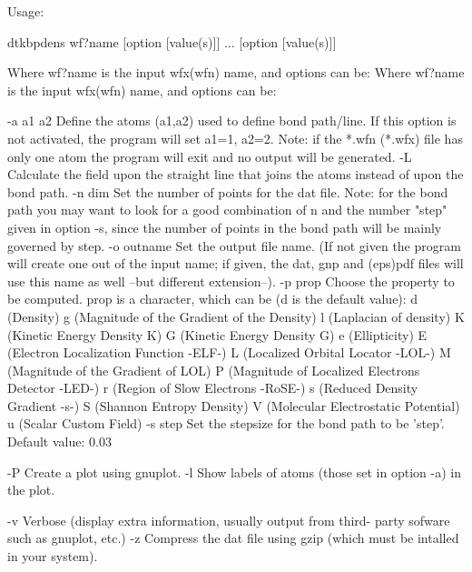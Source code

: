 

Usage:

	dtkbpdens wf?name [option [value(s)]] ... [option [value(s)]]

Where wf?name is the input wfx(wfn) name, and options can be:
Where wf?name is the input wfx(wfn) name, and options can be:

  -a a1 a2  	Define the atoms  (a1,a2) used to define bond path/line.
            	  If this option is not activated, the program will 
            	  set a1=1, a2=2.
            	  Note: if the *.wfn (*.wfx) file has only one atom
            	  the program will exit and no output will be generated.
  -L        	Calculate the field upon the straight line that joins the atoms
            	  instead of upon the bond path.
  -n  dim   	Set the number of points for the dat file.
            	  Note: for the bond path you may want to look for a good 
            	  combination of n and the number "step" given in option -s,
            	  since the number of points in the bond path will be mainly 
            	  governed by step.
  -o outname	Set the output file name.
            	  (If not given the program will create one out of
            	  the input name; if given, the dat, gnp and (eps)pdf files will
            	  use this name as well --but different extension--).
  -p prop   	Choose the property to be computed. prop is a character,
            	  which can be (d is the default value): 
            		d (Density)
            		g (Magnitude of the Gradient of the Density)
            		l (Laplacian of density)
            		K (Kinetic Energy Density K)
            		G (Kinetic Energy Density G)
            		e (Ellipticity)
            		E (Electron Localization Function -ELF-)
            		L (Localized Orbital Locator -LOL-)
            		M (Magnitude of the Gradient of LOL)
            		P (Magnitude of Localized Electrons Detector -LED-)
            		r (Region of Slow Electrons -RoSE-)
            		s (Reduced Density Gradient -s-)
            		S (Shannon Entropy Density)
            		V (Molecular Electrostatic Potential)
            		u (Scalar Custom Field)
  -s step   	Set the stepsize for the bond path to be 'step'.
            	  Default value: 0.03

  -P     	Create a plot using gnuplot.
  -l     	Show labels of atoms (those set in option -a) in the plot.

  -v     	Verbose (display extra information, usually output from third-
         	  party sofware such as gnuplot, etc.)
  -z     	Compress the dat file using gzip (which must be intalled
         	   in your system).

